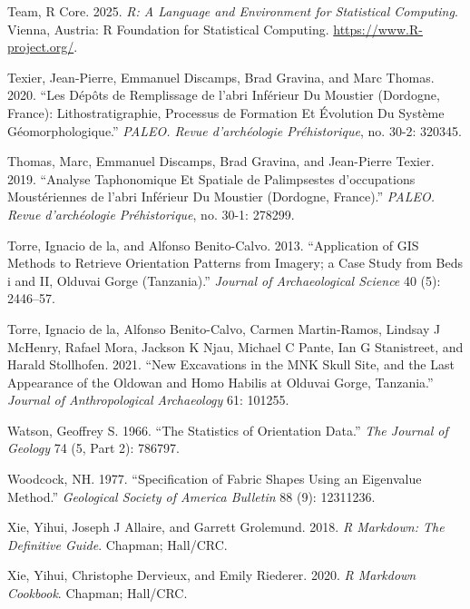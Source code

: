 \documentclass[
]{article}
\newlength{\cslhangindent}
\newenvironment{CSLReferences}[2] %
 {\begin{list}{}{%
  \setlength{\itemindent}{0pt}
  \setlength{\leftmargin}{0pt}
  \setlength{\parsep}{0pt}
  \ifodd #1
   \setlength{\leftmargin}{\cslhangindent}
   \setlength{\itemindent}{-1\cslhangindent}
  \fi
  \setlength{\itemsep}{#2\baselineskip}}}
 {\end{list}}
\begin{document}
\begin{CSLReferences}{1}{0}
Team, R Core. 2025. \emph{R: A Language and Environment for Statistical
Computing}. Vienna, Austria: R Foundation for Statistical Computing.
\url{https://www.R-project.org/}.

Texier, Jean-Pierre, Emmanuel Discamps, Brad Gravina, and Marc Thomas.
2020. {``Les Dépôts de Remplissage de l{'}abri Inférieur Du Moustier
(Dordogne, France): Lithostratigraphie, Processus de Formation Et
Évolution Du Système Géomorphologique.''} \emph{PALEO. Revue
d'archéologie Préhistorique}, no. 30-2: 320345.

Thomas, Marc, Emmanuel Discamps, Brad Gravina, and Jean-Pierre Texier.
2019. {``Analyse Taphonomique Et Spatiale de Palimpsestes d'occupations
Moustériennes de l'abri Inférieur Du Moustier (Dordogne, France).''}
\emph{PALEO. Revue d'archéologie Préhistorique}, no. 30-1: 278299.

Torre, Ignacio de la, and Alfonso Benito-Calvo. 2013. {``Application of
GIS Methods to Retrieve Orientation Patterns from Imagery; a Case Study
from Beds i and II, Olduvai Gorge (Tanzania).''} \emph{Journal of
Archaeological Science} 40 (5): 2446--57.

Torre, Ignacio de la, Alfonso Benito-Calvo, Carmen Martin-Ramos, Lindsay
J McHenry, Rafael Mora, Jackson K Njau, Michael C Pante, Ian G
Stanistreet, and Harald Stollhofen. 2021. {``New Excavations in the MNK
Skull Site, and the Last Appearance of the Oldowan and Homo Habilis at
Olduvai Gorge, Tanzania.''} \emph{Journal of Anthropological
Archaeology} 61: 101255.

Watson, Geoffrey S. 1966. {``The Statistics of Orientation Data.''}
\emph{The Journal of Geology} 74 (5, Part 2): 786797.

Woodcock, NH. 1977. {``Specification of Fabric Shapes Using an
Eigenvalue Method.''} \emph{Geological Society of America Bulletin} 88
(9): 12311236.

Xie, Yihui, Joseph J Allaire, and Garrett Grolemund. 2018. \emph{R
Markdown: The Definitive Guide}. Chapman; Hall/CRC.

Xie, Yihui, Christophe Dervieux, and Emily Riederer. 2020. \emph{R
Markdown Cookbook}. Chapman; Hall/CRC.

\end{CSLReferences}
\end{document}
